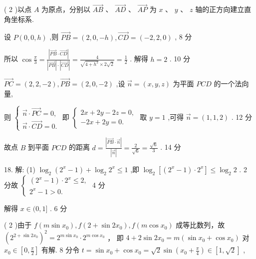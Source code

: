 \documentclass[10pt]{article}
\begin{document}
( 2 )以点 \(A\) 为原点，分别以 \(\overrightarrow{AB}\) 、 \(\overrightarrow{AD}\) 、 \(\overrightarrow{AP}\) 为 \(x\) 、 \(y\) 、 \(z\) 轴的正方向建立直角坐标系.

设 \(P\left( {0,0,h}\right)\) ,则 \(\overrightarrow{PB} = \left( {2,0, - h}\right) ,\overrightarrow{CD} = \left( {-2,2,0}\right)\) , 8 分

所以 \(\cos \frac{\pi }{3} = \frac{\left| \overrightarrow{PB} \cdot  \overrightarrow{CD}\right| }{\left| \overrightarrow{PB}\right|  \cdot  \left| \overrightarrow{CD}\right| } = \frac{4}{\sqrt{4 + {h}^{2}} \times  2\sqrt{2}} = \frac{1}{2}\) . 解得 \(h = 2\) . 10 分

\(\overrightarrow{PC} = \left( {2,2, - 2}\right) ,\overrightarrow{PB} = \left( {2,0, - 2}\right)\) ,设 \(\overrightarrow{n} = \left( {x,y,z}\right)\) 为平面 \({PCD}\) 的一个法向量,

则 \(\left\{  \begin{array}{l} \overrightarrow{n} \cdot  \overrightarrow{PC} = 0, \\  \overrightarrow{n} \cdot  \overrightarrow{CD} = 0. \end{array}\right.\) 即 \(\left\{  \begin{array}{l} {2x} + {2y} - {2z} = 0, \\   - {2x} + {2y} = 0. \end{array}\right.\) 取 \(y = 1\) ,可得 \(\overrightarrow{n} = \left( {1,1,2}\right)\) . 12 分

故点 \(B\) 到平面 \({PCD}\) 的距离 \(d = \frac{\left| \overrightarrow{PB} \cdot  \overrightarrow{n}\right| }{\left| \overrightarrow{n}\right| } = \frac{2}{\sqrt{6}} = \frac{\sqrt{6}}{3}\) . 14 分

18. 解: (1) \({\log }_{2}\left( {{2}^{x} - 1}\right)  + {\log }_{2}{2}^{x} \leq  1\) ,即 \({\log }_{2}\left\lbrack  {\left( {{2}^{x} - 1}\right)  \cdot  {2}^{x}}\right\rbrack   \leq  {\log }_{2}2\) . 2 分故 \(\left\{  \begin{array}{l} \left( {{2}^{x} - 1}\right)  \cdot  {2}^{x} \leq  2, \\  {2}^{x} - 1 > 0. \end{array}\right.\) 4 分

解得 \(x \in  (0,1\rbrack\) . 6 分

( 2 )由于 \(f\left( {m\sin {x}_{0}}\right) ,f\left( {2 + \sin 2{x}_{0}}\right) ,f\left( {m\cos {x}_{0}}\right)\) 成等比数列，故 \({\left( {2}^{2 + \sin 2{x}_{0}}\right) }^{2} = {2}^{m\sin {x}_{0}} \cdot  {2}^{m\cos {x}_{0}}\) ， 即 \(4 + 2\sin 2{x}_{0} = m\left( {\sin {x}_{0} + \cos {x}_{0}}\right)\) 对 \({x}_{0} \in  \left\lbrack  {0,\frac{\pi }{2}}\right\rbrack\) 有解. 8 分令 \(t = \sin {x}_{0} + \cos {x}_{0} = \sqrt{2}\sin \left( {{x}_{0} + \frac{\pi }{4}}\right)  \in  \left\lbrack  {1,\sqrt{2}}\right\rbrack\) ,
\end{document}
